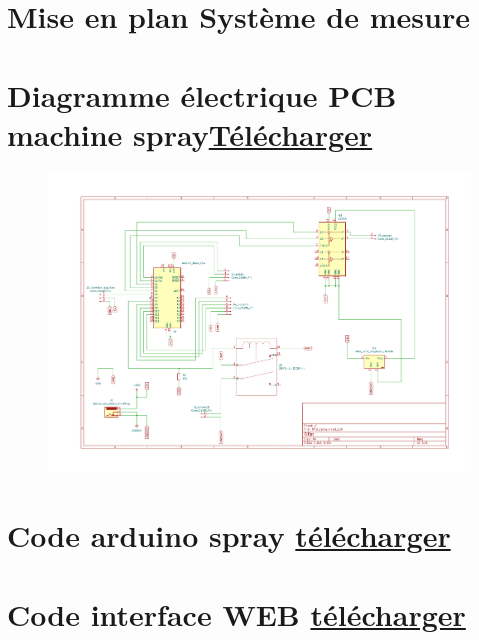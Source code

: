 \section[Mise en plan Système de mesure]{Mise en plan Système de mesure}\label{mise_en_plan_systeme_mesure}

\begin{figure}[H]
    \centering
    
\end{figure}


\section[Diagramme électrique PCB machine spray]{Diagramme électrique PCB machine spray\href{https://1drv.ms/b/s!Altwa7Vt0GlIj55oN6zv-TJly9lecA?e=SIccNb}{Télécharger}}\label{PCB:spray}
\begin{figure}[H]
    \centering
    \includegraphics[angle = 90,height = 0.8\paperheight]{assets/Annexes/Diagramme_PCB_spray.pdf}
\end{figure}

\newpage
\section[Code arduino spray]{Code arduino spray \href{https://1drv.ms/u/s!Altwa7Vt0GlIj55sbwjUy42-4cwf4g?e=tI8KgJ}{télécharger}}\label{code:arduino_spray}


\newpage
\section[Code interface WEB]{Code interface WEB \href{https://1drv.ms/u/s!Altwa7Vt0GlIj556q9wAVZ4g44uetA?e=RitRET}{télécharger}}\label{code:interface_web}

